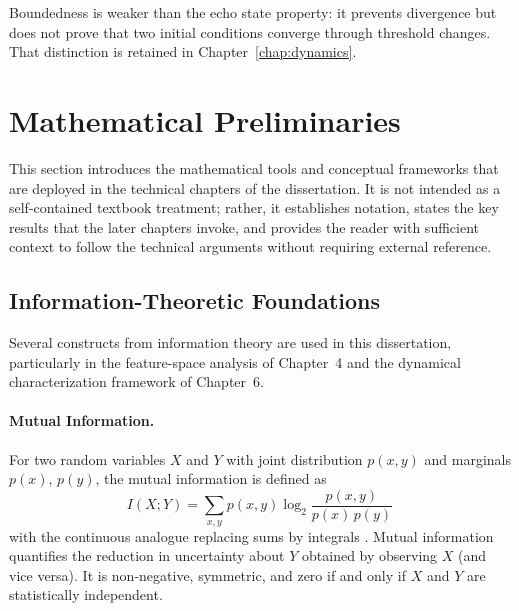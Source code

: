 Boundedness is weaker than the echo state property: it prevents divergence but
does not prove that two initial conditions converge through threshold changes.
That distinction is retained in Chapter~\ref{chap:dynamics}.


\section{Mathematical Preliminaries}
\label{sec:math_prelim}

This section introduces the mathematical tools and conceptual frameworks that are deployed in the technical chapters of the dissertation. It is not intended as a self-contained textbook treatment; rather, it establishes notation, states the key results that the later chapters invoke, and provides the reader with sufficient context to follow the technical arguments without requiring external reference.

\subsection{Information-Theoretic Foundations}
\label{sec:info_theory}

Several constructs from information theory are used in this dissertation, particularly in the feature-space analysis of Chapter~4 and the dynamical characterization framework of Chapter~6.

\paragraph{Mutual Information.}
For two random variables $X$ and $Y$ with joint distribution $p(x,y)$ and marginals $p(x)$, $p(y)$, the mutual information is defined as
\begin{equation}
    I(X; Y) = \sum_{x,y} p(x,y) \log_2 \frac{p(x,y)}{p(x)\,p(y)}\,
    \label{eq:mutual_info}
\end{equation}
with the continuous analogue replacing sums by integrals \cite{cover_elements_2006}. Mutual information quantifies the reduction in uncertainty about $Y$ obtained by observing $X$ (and vice versa). It is non-negative, symmetric, and zero if and only if $X$ and $Y$ are statistically independent.

